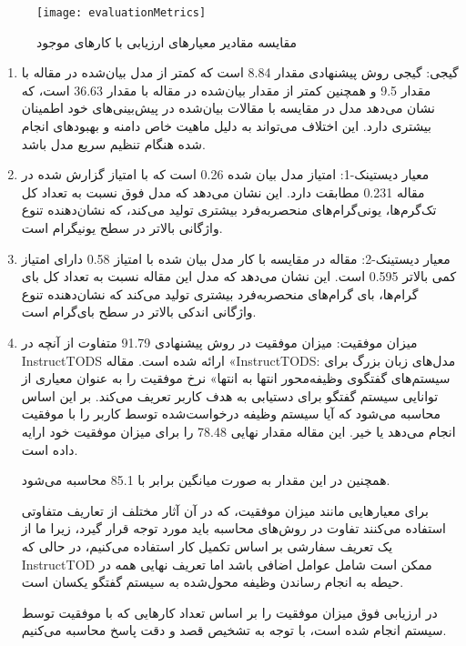 \begin{figure}[ht]
    \centerline{\texttt{[image: evaluationMetrics]}}
    \caption{مقایسه مقادیر معیارهای ارزیابی با کارهای موجود}
    \label{fig:evaluationMetrics}
\end{figure}
\begin{enumerate}
\item
گیجی: گیجی  روش پیشنهادی مقدار 
 \num{8.84}
 است که کمتر از مدل بیان‌شده در مقاله %
\cite{madotto2021few}
با مقدار
\num{9.5}
 و همچنین کمتر از مقدار بیان‌شده در مقاله %
\cite{chung2023instructtods}
با مقدار 
\num{36.63}
است، که نشان می‌دهد مدل در مقایسه با مقالات بیان‌شده در پیش‌بینی‌های خود اطمینان بیشتری دارد. این اختلاف می‌تواند به دلیل ماهیت خاص دامنه و بهبودهای انجام شده هنگام تنظیم سریع مدل باشد.

\item
معیار دیستینک-1: امتیاز مدل بیان شده 
 \num{0.26}
 است که با امتیاز گزارش شده در مقاله%
\cite{kasahara2022building}
\num{0.231}
 مطابقت دارد. این نشان می‌دهد که مدل فوق نسبت به تعداد کل تک‌گرم‌ها، یونی‌گرام‌های منحصربه‌فرد بیشتری تولید می‌کند، که نشان‌دهنده تنوع واژگانی بالاتر در سطح یونیگرام است.

\item
معیار دیستینک-2: مقاله 
\cite{kasahara2022building}
در مقایسه با کار مدل بیان شده با امتیاز 
\num{0.58}
 دارای امتیاز کمی بالاتر 
\num{0.595}
است. این نشان می‌دهد که مدل این مقاله نسبت به تعداد کل بای گرام‌ها، بای گرام‌های منحصربه‌فرد بیشتری تولید می‌کند که نشان‌دهنده تنوع واژگانی اندکی بالاتر در سطح بای‌گرام است.

\item
میزان موفقیت: میزان موفقیت در  روش پیشنهادی 
\num{91.79}
 متفاوت از آنچه در InstructTODS ارائه شده است.
مقاله «InstructTODS: مدل‌های زبان بزرگ برای سیستم‌های گفتگوی وظیفه‌محور انتها به انتها»
\cite{chung2023instructtods}
 نرخ موفقیت را به عنوان معیاری از توانایی سیستم گفتگو برای دستیابی به هدف کاربر تعریف می‌کند. بر این اساس محاسبه می‌شود که آیا سیستم وظیفه درخواست‌شده توسط کاربر را با موفقیت انجام می‌دهد یا خیر. این مقاله مقدار نهایی
\num{78.48}
را برای میزان موفقیت خود ارایه داده است.

همچنین در 
\cite{hu2024dialight}
این مقدار به صورت میانگین برابر با 
\num{85.1}
محاسبه می‌شود. 


برای معیارهایی مانند میزان موفقیت، که در آن آثار مختلف از تعاریف متفاوتی استفاده می‌کنند تفاوت در روش‌های محاسبه باید مورد توجه قرار گیرد، زیرا ما از یک تعریف سفارشی بر اساس تکمیل کار استفاده می‌کنیم، در حالی که InstructTOD ممکن است شامل عوامل اضافی باشد اما تعریف نهایی همه در حیطه به انجام ‌رساندن وظیفه محول‌شده به سیستم گفتگو یکسان است.

در ارزیابی فوق میزان موفقیت را بر اساس تعداد کارهایی که با موفقیت توسط سیستم انجام شده است، با توجه به تشخیص قصد و دقت پاسخ محاسبه می‌کنیم.

\end{enumerate}


